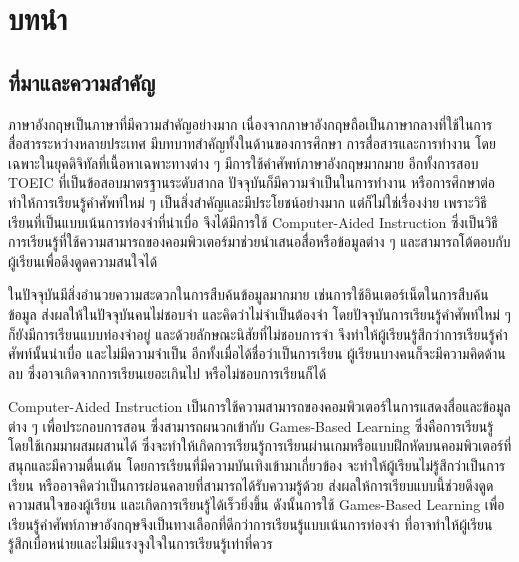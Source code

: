 \documentclass[12pt,oneside,openright,a4paper]{cpe-thai-project}
\begin{document}

\chapter{บทนำ}

\section{ที่มาและความสำคัญ}

\hspace{1cm}
ภาษาอังกฤษเป็นภาษาที่มีความสำคัญอย่างมาก เนื่องจากภาษาอังกฤษถือเป็นภาษากลางที่ใช้ในการสื่อสารระหว่างหลายประเทศ
มีบทบาทสำคัญทั้งในด้านของการศึกษา การสื่อสารและการทำงาน โดยเฉพาะในยุคดิจิทัลที่เนื้อหาเฉพาะทางต่าง ๆ มีการใช้คำศัพท์ภาษาอังกฤษมากมาย
อีกทั้งการสอบ TOEIC ที่เป็นข้อสอบมาตรฐานระดับสากล ปัจจุบันก็มีความจำเป็นในการทำงาน หรือการศึกษาต่อ
ทำให้การเรียนรู้คำศัพท์ใหม่ ๆ เป็นสิ่งสำคัญและมีประโยชน์อย่างมาก  แต่ก็ไม่ใช่เรื่องง่าย เพราะวิธีเรียนที่เป็นแบบเน้นการท่องจำที่น่าเบื่อ
จึงได้มีการใช้ Computer-Aided Instruction ซึ่งเป็นวิธีการเรียนรู้ที่ใช้ความสามารถของคอมพิวเตอร์มาช่วยนำเสนอสื่อหรือข้อมูลต่าง ๆ
และสามารถโต้ตอบกับผู้เรียนเพื่อดึงดูดความสนใจได้

\hspace{1cm}
ในปัจจุบันมีสิ่งอำนวยความสะดวกในการสืบค้นข้อมูลมากมาย เช่นการใช้อินเตอร์เน็ตในการสืบค้นข้อมูล ส่งผลให้ในปัจจุบันคนไม่ชอบจำ
และคิดว่าไม่จำเป็นต้องจำ โดยปัจจุบันการเรียนรู้คำศัพท์ใหม่ ๆ ก็ยังมีการเรียนแบบท่องจำอยู่ และด้วยลักษณะนิสัยที่ไม่ชอบการจำ
จึงทำให้ผู้เรียนรู้สึกว่าการเรียนรู้คำศัพท์นั้นน่าเบื่อ และไม่มีความจำเป็น อีกทั้งเมื่อได้ชื่อว่าเป็นการเรียน ผู้เรียนบางคนก็จะมีความคิดด้านลบ
ซึ่งอาจเกิดจากการเรียนเยอะเกินไป หรือไม่ชอบการเรียนก็ได้

\hspace{1cm}
Computer-Aided Instruction เป็นการใช้ความสามารถของคอมพิวเตอร์ในการแสดงสื่อและข้อมูลต่าง ๆ เพื่อประกอบการสอน
ซึ่งสามารถผนวกเข้ากับ Games-Based Learning ซึ่งคือการเรียนรู้โดยใช้เกมมาผสมผสานได้
ซึ่งจะทำให้เกิดการเรียนรู้การเรียนผ่านเกมหรือแบบฝึกหัดบนคอมพิวเตอร์ที่สนุกและมีความตื่นเต้น โดยการเรียนที่มีความบันเทิงเข้ามาเกี่ยวข้อง
จะทำให้ผู้เรียนไม่รู้สึกว่าเป็นการเรียน หรืออาจคิดว่าเป็นการผ่อนคลายที่สามารถได้รับความรู้ด้วย ส่งผลให้การเรียบแบบนี้ช่วยดึงดูดความสนใจของผู้เรียน
และเกิดการเรียนรู้ได้เร็วยิ่งขึ้น ดังนั้นการใช้ Games-Based Learning เพื่อเรียนรู้คำศัพท์ภาษาอังกฤษจึงเป็นทางเลือกที่ดีกว่าการเรียนรู้แบบเน้นการท่องจำ
ที่อาจทำให้ผู้เรียนรู้สึกเบื่อหน่ายและไม่มีแรงจูงใจในการเรียนรู้เท่าที่ควร
\end{document}
